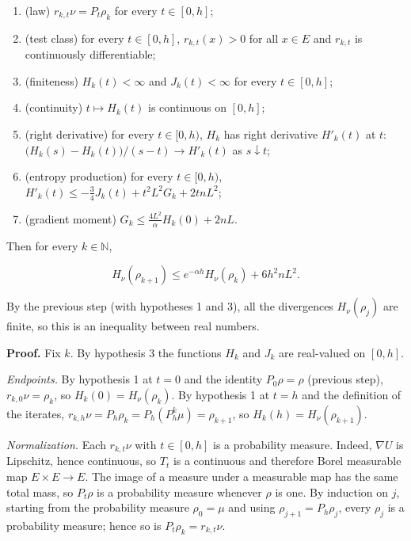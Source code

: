 \documentclass[11pt,a4paper]{article}
\begin{document}
\begin{enumerate}


\item (law) \(r_{k,t}\nu=P_t\rho_k\) for every \(t\in[0,h]\);

\item (test class) for every \(t\in[0,h]\), \(r_{k,t}(x)>0\) for all \(x\in E\) and \(r_{k,t}\) is continuously differentiable;

\item (finiteness) \(H_k(t)<\infty\) and \(J_k(t)<\infty\) for every \(t\in[0,h]\);

\item (continuity) \(t\mapsto H_k(t)\) is continuous on \([0,h]\);

\item (right derivative) for every \(t\in[0,h)\), \(H_k\) has right derivative \(H'_k(t)\) at \(t\): \(\bigl(H_k(s)-H_k(t)\bigr)/(s-t)\to H'_k(t)\) as \(s\downarrow t\);

\item (entropy production) for every \(t\in[0,h)\), \(H'_k(t)\le-\frac34J_k(t)+t^2L^2G_k+2tnL^2\);

\item (gradient moment) \(G_k\le\frac{4L^2}{\alpha}H_k(0)+2nL\).

\end{enumerate}



Then for every \(k\in\mathbb N\),


\[H_\nu(\rho_{k+1})\le e^{-\alpha h}H_\nu(\rho_k)+6h^2nL^2.\]


By the previous step (with hypotheses 1 and 3), all the divergences \(H_\nu(\rho_j)\) are finite, so this is an inequality between real numbers.




\textbf{Proof.} Fix \(k\). By hypothesis 3 the functions \(H_k\) and \(J_k\) are real-valued on \([0,h]\).




\emph{Endpoints.} By hypothesis 1 at \(t=0\) and the identity \(P_0\rho=\rho\) (previous step), \(r_{k,0}\nu=\rho_k\), so \(H_k(0)=H_\nu(\rho_k)\). By hypothesis 1 at \(t=h\) and the definition of the iterates, \(r_{k,h}\nu=P_h\rho_k=P_h(P_h^k\mu)=\rho_{k+1}\), so \(H_k(h)=H_\nu(\rho_{k+1})\).




\emph{Normalization.} Each \(r_{k,t}\nu\) with \(t\in[0,h]\) is a probability measure. Indeed, \(\nabla U\) is Lipschitz, hence continuous, so \(T_t\) is a continuous and therefore Borel measurable map \(E\times E\to E\). The image of a measure under a measurable map has the same total mass, so \(P_t\rho\) is a probability measure whenever \(\rho\) is one. By induction on \(j\), starting from the probability measure \(\rho_0=\mu\) and using \(\rho_{j+1}=P_h\rho_j\), every \(\rho_j\) is a probability measure; hence so is \(P_t\rho_k=r_{k,t}\nu\).
\end{document}
